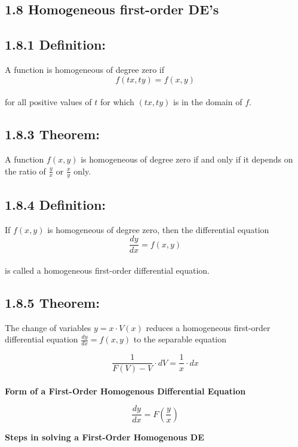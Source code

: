 \documentclass{article}
\begin{document}
\begin{flushleft}
{}
\section*{1.8 Homogeneous first-order DE’s}{

\subsection*{\textbf{1.8.1 Definition:}}
A function is homogeneous of degree zero if\\

\[f(tx,ty) = f(x,y)\] \\

for all positive values of $t$ for which $(tx , ty)$ is in the domain of $f$.\\


\subsection*{\textbf{1.8.3 Theorem:}}
 A function $f(x,y)$ is homogeneous of degree zero if and only if it depends on the ratio of $\frac{y}{x}$ or $\frac{x}{y}$ only. \\

\subsection*{\textbf{1.8.4 Definition:}}
If $f(x,y)$ is homogeneous of degree zero, then the differential equation 
\[ \frac{dy}{dx} = f(x,y) \]\\
is called a homogeneous first-order differential equation. 

\subsection*{\textbf{1.8.5 Theorem:}}
The change of variables $ y = x \cdot V(x) $ reduces a homogeneous first-order differential equation 
$ \frac{dy}{dx} = f(x,y) $ to the separable equation 

\[\frac{1}{F(V) - V} \cdot dV = \frac{1}{x} \cdot dx \]\\

\textbf{Form of a First-Order Homogenous Differential Equation\\}

\[ \frac{dy}{dx} = F (\frac{y}{x}) \]

\textbf{Steps in solving a First-Order Homogenous DE}\\

}
\end{flushleft}
\end{document}
